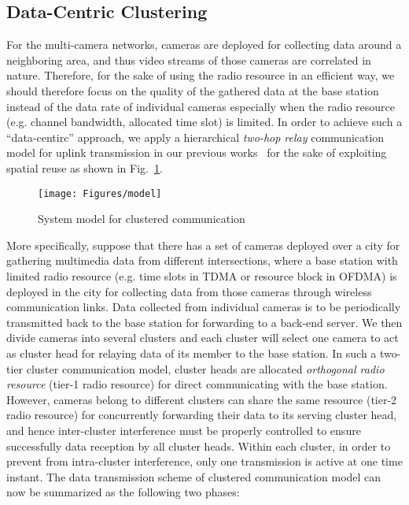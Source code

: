 \subsection{Data-Centric Clustering}
\label{sec::dcClustering}
%
For the multi-camera networks, cameras are deployed for collecting data around a neighboring area, and thus video streams of those cameras are correlated in nature.
Therefore, for the sake of using the radio resource in an efficient way, we should therefore focus on the quality of the gathered data at the base station instead of the data rate of individual cameras especially when the radio resource (e.g. channel bandwidth, allocated time slot) is limited.
In order to achieve such a ``data-centirc'' approach, we apply a hierarchical \emph{two-hop relay} communication model for uplink transmission in our previous works~\cite{steven} for the sake of exploiting spatial reuse as shown in Fig.~\ref{fig::dcModel}.
%
\begin{figure}
\centering
\texttt{[image: Figures/model]}
\caption{\label{fig::dcModel}System model for clustered communication}
\end{figure}
%
More specifically, suppose that there has a set of cameras deployed over a city for gathering multimedia data from different intersections, where a base station with limited radio resource (e.g. time slots in TDMA or resource block in OFDMA) is deployed in the city for collecting data from those cameras through wireless communication links.
Data collected from individual cameras is to be periodically transmitted back to the base station for forwarding to a back-end server.
We then divide cameras into several clusters and each cluster will select one camera to act as cluster head for relaying data of its member to the base station.
In such a two-tier cluster communication model, cluster heads are allocated \emph{orthogonal radio resource} (tier-1 radio resource) for direct communicating with the base station.
However, cameras belong to different clusters can share the same resource (tier-2 radio resource) for concurrently forwarding their data to its serving cluster head, and hence inter-cluster interference must be properly controlled to ensure successfully data reception by all cluster heads. 
Within each cluster, in order to prevent from intra-cluster interference, only one transmission is active at one time instant.
The data transmission scheme of clustered communication model can now be summarized as the following two phases:
